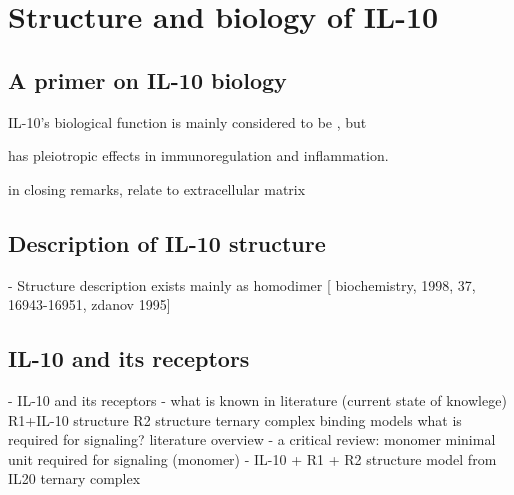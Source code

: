 \chapter{Structure and biology of IL-10}


\section{A primer on IL-10 biology}


 IL-10's biological function is mainly considered to be
, but

 has pleiotropic effects in immunoregulation and
inflammation.


        in closing remarks, relate to extracellular matrix

\section{Description of IL-10 structure}

    - Structure description
        exists mainly as homodimer [
            biochemistry, 1998, 37, 16943-16951, zdanov 1995]

\section{IL-10 and its receptors}

    - IL-10 and its receptors
        - what is known in literature (current state of knowlege)
            R1+IL-10 structure
            R2 structure
            ternary complex binding models
            what is required for signaling? literature overview
        - a critical review: monomer
            minimal unit required for signaling (monomer)
        - IL-10 + R1 + R2 structure model from IL20 ternary complex


\lipsum[1-5]